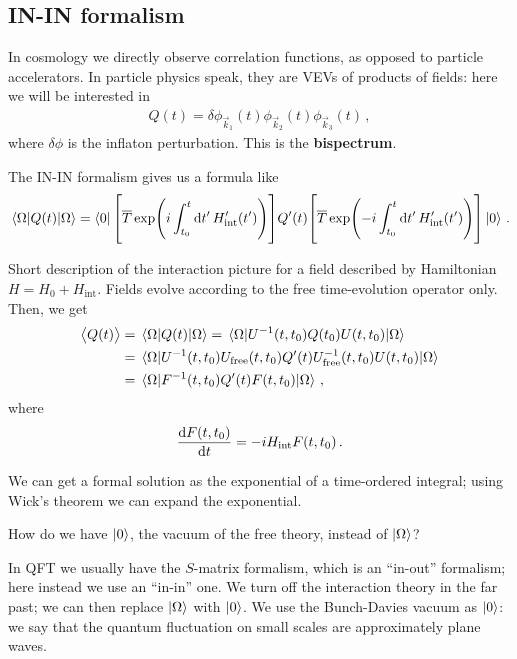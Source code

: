 \documentclass[main.tex]{subfiles}
\begin{document}
\subsection{IN-IN formalism}



In cosmology we directly observe correlation functions, as opposed to particle accelerators. 
In particle physics speak, they are VEVs of products of fields: here we will be interested in 
%
\begin{align}
Q(t) = \delta 
\phi _{\vec{k}_1}(t)
\phi _{\vec{k}_2}(t)
\phi _{\vec{k}_3}(t)
\,,
\end{align}
%
where \(\delta \phi \) is the inflaton perturbation. This is the \textbf{bispectrum}.

The IN-IN formalism gives us a formula like 
%
\begin{align}
\ev{Q(t)}{\Omega }
= \bra{0}
\qty[\overline{T} \exp(i \int_{t_0 }^{t} \dd{t'} H' _{\text{int}} (t'))]
Q'(t)
\qty[\overline{T} \exp(-i \int_{t_0 }^{t} \dd{t'} H' _{\text{int}} (t'))]
\ket{0}
\,.
\end{align}

Short description of the interaction picture for a field described by  Hamiltonian \(H = H_0 + H _{\text{int}}\).
Fields evolve according to the free time-evolution operator only. 
Then, we get 
%
\begin{align}
\expval{Q(t)}
&= \ev{Q(t)}{\Omega } = \ev{U^{-1}(t, t_0 ) Q (t_0 ) U(t, t_0 )}{\Omega } \\
&= \ev{U^{-1} (t, t_0 ) U _{\text{free}} (t, t_0 ) Q' (t) U^{-1} _{\text{free}} (t, t_0 ) U(t, t_0 )}{\Omega }  \\
&= \ev{F^{-1}(t, t_0 ) Q'(t) F (t, t_0 )}{\Omega }
\,,
\end{align}
%
where 
%
\begin{align}
\dv{F(t, t_0 )}{t} = -i H _{\text{int}} F(t, t_0 )
\,.
\end{align}

We can get a formal solution as the exponential of a time-ordered integral;
using Wick's theorem we can expand the exponential. 

How do we have \(\ket{0}\), the vacuum of the free theory, instead of \(\ket{\Omega }\)?

In QFT we usually have the \(S\)-matrix formalism, which is an ``in-out'' formalism; here instead we use an ``in-in'' one. 
We turn off the interaction theory in the far past; we can then replace \(\ket{\Omega }\) with \(\ket{0}\). 
We use the Bunch-Davies vacuum as \(\ket{0}\): we say that the quantum fluctuation on small scales are approximately plane waves.
\end{document}
